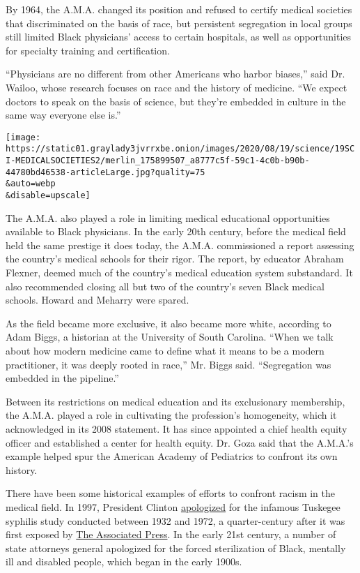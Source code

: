 By 1964, the A.M.A. changed its position and refused to certify medical
societies that discriminated on the basis of race, but persistent
segregation in local groups still limited Black physicians' access to
certain hospitals, as well as opportunities for specialty training and
certification.

``Physicians are no different from other Americans who harbor biases,''
said Dr. Wailoo, whose research focuses on race and the history of
medicine. ``We expect doctors to speak on the basis of science, but
they're embedded in culture in the same way everyone else is.''

\texttt{[image: https://static01.graylady3jvrrxbe.onion/images/2020/08/19/science/19SCI-MEDICALSOCIETIES2/merlin\_175899507\_a8777c5f-59c1-4c0b-b90b-44780bd46538-articleLarge.jpg?quality=75\\\&auto=webp\\\&disable=upscale]}

The A.M.A. also played a role in limiting medical educational
opportunities available to Black physicians. In the early 20th century,
before the medical field held the same prestige it does today, the
A.M.A. commissioned a report assessing the country's medical schools for
their rigor. The report, by educator Abraham Flexner, deemed much of the
country's medical education system substandard. It also recommended
closing all but two of the country's seven Black medical schools. Howard
and Meharry were spared.

As the field became more exclusive, it also became more white, according
to Adam Biggs, a historian at the University of South Carolina. ``When
we talk about how modern medicine came to define what it means to be a
modern practitioner, it was deeply rooted in race,'' Mr. Biggs said.
``Segregation was embedded in the pipeline.''

Between its restrictions on medical education and its exclusionary
membership, the A.M.A. played a role in cultivating the profession's
homogeneity, which it acknowledged in its 2008 statement. It has since
appointed a chief health equity officer and established a center for
health equity. Dr. Goza said that the A.M.A.'s example helped spur the
American Academy of Pediatrics to confront its own history.

There have been some historical examples of efforts to confront racism
in the medical field. In 1997, President Clinton
\href{https://www.cdc.gov/tuskegee/clintonp.htm}{apologized} for the
infamous Tuskegee syphilis study conducted between 1932 and 1972, a
quarter-century after it was first exposed by
\href{https://apnews.com/e9dd07eaa4e74052878a68132cd3803a/AP-WAS-THERE:-Black-men-untreated-in-Tuskegee-Syphilis-Study}{The
Associated Press}. In the early 21st century, a number of state
attorneys general apologized for the forced sterilization of Black,
mentally ill and disabled people, which began in the early 1900s.

